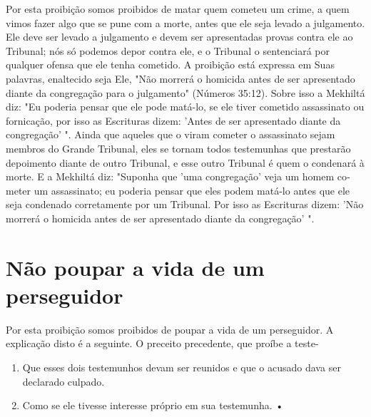 Por esta proibição somos proibidos de matar quem cometeu um cri­me, a
quem vimos fazer algo que se pune com a morte, antes que ele seja levado
a julgamento. Ele deve ser levado a julgamento e devem ser apresentadas
provas contra ele ao Tribunal; nós só podemos depor contra ele, e o
Tribunal o senten­ciará por qualquer ofensa que ele tenha cometido. A
proibição está expressa em Suas palavras, enaltecido seja Ele, "Não
morrerá o homicida antes de ser apresen­tado diante da congregação para
o julgamento" (Números 35:12). Sobre isso a Mek­hiltá diz: "Eu poderia
pensar que ele pode matá-lo, se ele tiver cometido assassi­nato ou
fornicação, por isso as Escrituras dizem: 'Antes de ser apresentado
diante da congregação' ". Ainda que aqueles que o viram cometer o
assassinato sejam membros do Grande Tribunal, eles se tornam todos
testemunhas que prestarão depoimento diante de outro Tribunal, e esse
outro Tribunal é quem o condenará à morte. E a Mekhiltá diz: "Suponha
que 'uma congregação' veja um homem co­meter um assassinato; eu poderia
pensar que eles podem matá-lo antes que ele seja condenado corretamente
por um Tribunal. Por isso as Escrituras dizem: 'Não morrerá o homicida
antes de ser apresentado diante da congregação' ".

\section{Não poupar a vida de um perseguidor}

Por esta proibição somos proibidos de poupar a vida de um perse­guidor.
A explicação disto é a seguinte. O preceito precedente, que proíbe a
teste-


\begin{enumerate}
\def\labelenumi{\arabic{enumi}.}
\setcounter{enumi}{417}
\item
 
 Que esses dois testemunhos devam ser reunidos e que o acusado dava ser
 declarado culpado.
 
\item
 
 Como se ele tivesse interesse próprio em sua testemunha. •
 
\end{enumerate}



